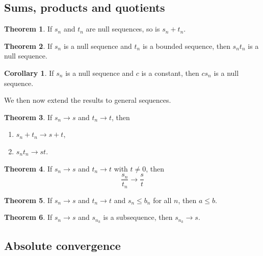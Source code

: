 \documentclass[12pt]{book}
\newcommand{\ra}{\rightarrow}
\theoremstyle{definition}
\newtheorem{theorem}{Theorem}[chapter]
\newtheorem{corollary}{Corollary}[section]
\theoremstyle{remark}
\begin{document}
    		\subsection{Sums, products and quotients}
    			\begin{theorem}
    				If $s_n$ and $t_n$ are null sequences, so is $s_n + t_n$.
    			\end{theorem}
    		
    			\begin{theorem}
    				If $s_n$ is a null sequence and $t_n$ is a bounded sequence, then $s_n t_n$ is a null sequence.
    			\end{theorem}
    		
    			\begin{corollary}
    				If $s_n$ is a null sequence and $c$ is a constant, then $cs_n$ is a null sequence.
    			\end{corollary}
    				We then now extend the results to general sequences.
    			\begin{theorem}
    				If $s_n \ra s$ and $t_n \ra t$, then
    				\begin{enumerate}
    					\item $s_n + t_n \ra s + t$,
    					\item $s_n t_n \ra st$.
    				\end{enumerate}
    			\end{theorem}
    		
    			\begin{theorem}
    				If $s_n \ra s$ and $t_n \ra t$ with $t \neq 0$, then
    				\begin{equation*}
    					\frac{s_n}{t_n} \ra \frac{s}{t}
    				\end{equation*}
    			\end{theorem}
    			
    			\begin{theorem}
    				If $s_n \ra s$ and $t_n \ra t$ and $s_n \leq b_n$ for all $n$, then $a \leq b$.
    			\end{theorem}
    		
    			\begin{theorem}
    				If $s_n \ra s$ and $s_{n_k}$ is a subsequence, then $s_{n_k} \ra s$.
    			\end{theorem}
    		
			\subsection{Absolute convergence}
			
\end{document}
